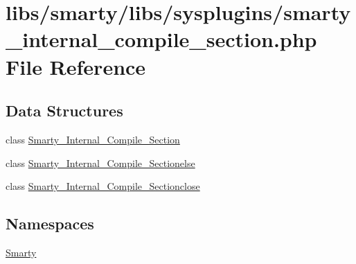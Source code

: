 \hypertarget{smarty__internal__compile__section_8php}{}\section{libs/smarty/libs/sysplugins/smarty\+\_\+internal\+\_\+compile\+\_\+section.php File Reference}
\label{smarty__internal__compile__section_8php}
\subsection*{Data Structures}
\begin{DoxyCompactItemize}
\item 
class \hyperlink{class_smarty___internal___compile___section}{Smarty\+\_\+\+Internal\+\_\+\+Compile\+\_\+\+Section}
\item 
class \hyperlink{class_smarty___internal___compile___sectionelse}{Smarty\+\_\+\+Internal\+\_\+\+Compile\+\_\+\+Sectionelse}
\item 
class \hyperlink{class_smarty___internal___compile___sectionclose}{Smarty\+\_\+\+Internal\+\_\+\+Compile\+\_\+\+Sectionclose}
\end{DoxyCompactItemize}
\subsection*{Namespaces}
\begin{DoxyCompactItemize}
\item 
 \hyperlink{namespace_smarty}{Smarty}
\end{DoxyCompactItemize}
